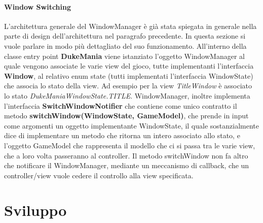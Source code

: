 \documentclass[a4paper,12pt]{report}
\begin{document}
\subsubsection{Window Switching}
L'architettura generale del WindowManager è già stata spiegata in generale nella parte di design dell'architettura nel paragrafo precedente.
In questa sezione si vuole parlare in modo più dettagliato del suo funzionamento.
All'interno della classe entry point \textbf{DukeMania} viene istanziato l'oggetto WindowManager al quale vengono associate le varie view del gioco, tutte implementanti l'interfaccia \textbf{Window},
al relativo enum state (tutti implementati l'interfaccia WindowState) che associa lo stato della view. Ad esempio per la view \emph{TitleWindow} è associato lo stato \emph{DukeManiaWindowState.TITLE}.
WindowManager, inoltre implementa l'interfaccia \textbf{SwitchWindowNotifier} che contiene come unico contratto il metodo \textbf{switchWindow(WindowState, GameModel)}, che prende in input come 
argomenti un oggetto implementante WindowState, il quale sostanzialmente dice di implementare un metodo che ritorna un intero associato allo stato, e l'oggetto GameModel che rappresenta il
modello che ci si passa tra le varie view, che a loro volta passeranno al controller.
Il metodo switchWindow non fa altro che notificare il WindowManager, mediante un meccanismo di callback, che un controller/view vuole cedere il controllo alla view specificata.
\newpage



\chapter{Sviluppo}
\end{document}
